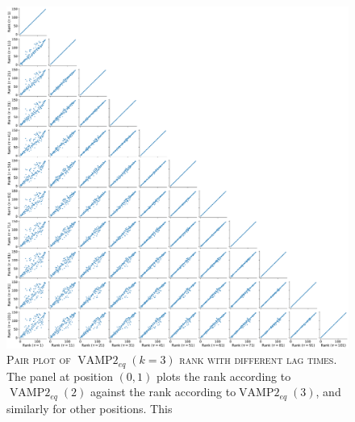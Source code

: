 \documentclass{article}
\begin{document}
\begin{figure}
    \centering
    \includegraphics[width=1.0\textwidth]{SI_figures/1fme_vampeq_rank_vs_lag_pairplot_k3.pdf}
    \caption{\textsc{Pair plot of $\operatorname{VAMP2}_{eq}(k=3)$ rank with different lag times.} The panel at position $(0,1)$ plots the rank according to$\operatorname{VAMP2}_{eq}(2)$ against the  rank according to$\operatorname{VAMP2}_{eq}(3)$, and similarly for other positions. This }
    \label{fig:vampeq3_rank_vs_lag_pairplot}
\end{figure}
\end{document}
